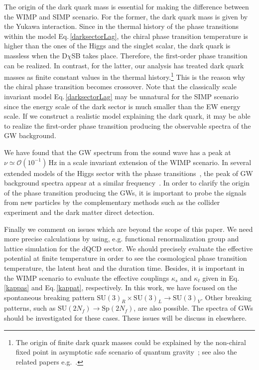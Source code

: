 \documentclass[a4paper,preprint,superscriptaddress,preprintnumbers,nofootinbib]{revtex4}
\newcommand{\fn}[1]{\!\left(#1\right)}
\begin{document}
The origin of the dark quark mass is essential for making the difference between the WIMP and SIMP {scenario}.
For the former, the dark quark mass is given by the Yukawa interaction.
Since in the thermal history of the phase transitions within the model Eq.\,\eqref{darksectorLag}, the chiral phase transition temperature is higher than the ones of the Higgs and the singlet scalar, the dark quark is massless when the D$\chi$SB takes place.
Therefore, the first-order phase transition can be realized.
In contrast, for the latter, our analysis has treated dark quark masses as finite constant values in the thermal history.\footnote{
The origin of finite dark quark masses could be explained by the non-chiral fixed point in asymptotic safe scenario of quantum gravity~\cite{Eichhorn:2016vvy}; see also the related papers e.g.~\cite{Niedermaier:2006wt,Niedermaier:2006ns,Codello:2008vh,Reuter:2012id,Oda:2015sma,Wetterich:2016uxm,Hamada:2017rvn}.
}
This is the reason why the chiral phase transition becomes crossover.
Note that the classically scale invariant model Eq.\,\eqref{darksectorLag} may be unnatural for the SIMP scenario since the energy scale of the dark sector is much smaller than the EW energy scale.
If we construct a realistic model explaining the dark quark, it may be able to realize the first-order phase transition producing the observable {spectra} of the GW background.

We have found that the GW spectrum from the sound wave has a peak at $\nu\simeq {\mathcal O}\fn{10^{-1}}\, \text{Hz}$ in a scale invariant extension of the WIMP scenario.
In several extended models of the Higgs sector with the phase transitions~\cite{Iso:2009ss,Kubo:2014ova,Kubo:2015cna,Kubo:2015joa,Haba:2015qbz,Ishida:2016ogu,Ishida:2016fbp,Ishida:2017ehu,Haba:2017wwn,Haba:2017quk}, the peak of GW background {spectra} appear at a similar frequency~\cite{Leitao:2012tx,Kakizaki:2015wua,Jinno:2015doa,Jaeckel:2016jlh,Hashino:2016rvx,Jinno:2016knw,Hashino:2016xoj,Kubo:2016kpb,Balazs:2016tbi,Baldes:2017rcu,Chao:2017vrq}.
In order to clarify the origin of the phase transition producing the GWs, it is important to probe the signals from new particles by the {complementary} methods such as the collider experiment and the dark matter direct detection.

Finally we comment on issues which are beyond the scope of this paper.
We need more precise calculations by using, e.g. functional renormalization group and lattice simulation for the dQCD sector.
We should precisely evaluate the effective potential at finite temperature in order to see the cosmological phase transition temperature, the latent heat and the duration time.
Besides, it is important in the WIMP scenario to evaluate the effective couplings $\kappa_s$ and $\kappa_t$ given in Eq.\,\eqref{kappas} and Eq.\,\eqref{kappat}, respectively.
In this work, we have focused on the spontaneous breaking pattern $\text{SU}\fn{3}_R\times \text{SU}\fn{3}_L\to \text{SU}\fn{3}_V$.
Other breaking patterns, such as $\text{SU}\fn{2N_f}\to \text{Sp}\fn{2N_f}$, are also possible.
The {spectra} of GWs should be investigated for these cases.
These issues will be discuss in elsewhere.
\end{document}
